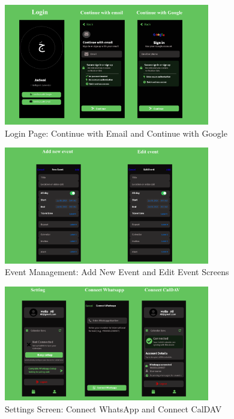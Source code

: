 \begin{figure}[H]
    \centering
    \includegraphics[width=0.8\textwidth]{images/front-end1.png}
    \caption{Login Page: Continue with Email and Continue with Google}
    \label{fig:wireframe-login}
\end{figure}

\begin{figure}[H]
    \centering
    \includegraphics[width=0.8\textwidth]{images/front-end2.png}
    \caption{Event Management: Add New Event and Edit Event Screens}
    \label{fig:wireframe-events}
\end{figure}

\begin{figure}[H]
    \centering
    \includegraphics[width=0.8\textwidth]{images/front-end3.png}
    \caption{Settings Screen: Connect WhatsApp and Connect CalDAV}
    \label{fig:wireframe-settings}
\end{figure}

